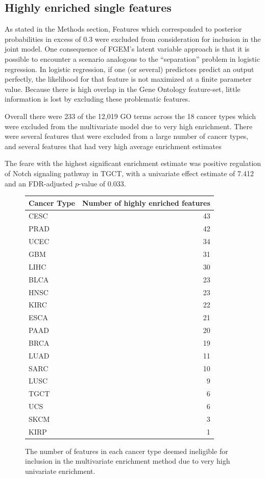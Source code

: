 \subsection{Highly enriched single features}\label{sec:org530c0fc}

As stated in the Methods section, Features which corresponded to posterior probabilities in excess of 0.3 were excluded from consideration for inclusion in the joint model.  One consequence of FGEM's latent variable approach
is that it is possible to encounter a scenario analogous to the ``separation'' problem in logistic regression.  In logistic regression, if one (or several) predictors predict an output perfectly, the likelihood for that 
feature is not maximized at a finite parameter value. Because there is high overlap in the Gene Ontology feature-set, little information is lost by excluding these problematic features.  

Overall there were 233 of the 12,019 GO terms across the 18 cancer types which were excluded from the multivariate model due to very high enrichment.  There were several features that were excluded from a large number of cancer types, and several features that had very high average enrichment estimates

The feare with the highest significant enrichment estimate was positive regulation of Notch signaling pathway in TGCT, with a univariate effect estimate of 7.412 and an FDR-adjusted $p$-value of 0.033.



\begin{figure}
    \centering
\begin{tabular}{l|r}
  \hline
  Cancer Type & Number of highly enriched features\\
  \hline
  CESC & 43\\
  \hline
  PRAD & 42\\
  \hline
  UCEC & 34\\
  \hline
  GBM & 31\\
  \hline
  LIHC & 30\\
  \hline
  BLCA & 23\\
  \hline
  HNSC & 23\\
  \hline
  KIRC & 22\\
  \hline
  ESCA & 21\\
  \hline
  PAAD & 20\\
  \hline
  BRCA & 19\\
  \hline
  LUAD & 11\\
  \hline
  SARC & 10\\
  \hline
  LUSC & 9\\
  \hline
  TGCT & 6\\
  \hline
  UCS & 6\\
  \hline
  SKCM & 3\\
  \hline
  KIRP & 1\\
  \hline
\end{tabular}
    \label{fig:n_enriched}
    \caption{The number of features in each cancer type deemed ineligible for inclusion in the multivariate enrichment method due to very high univariate enrichment.}
\end{figure}


